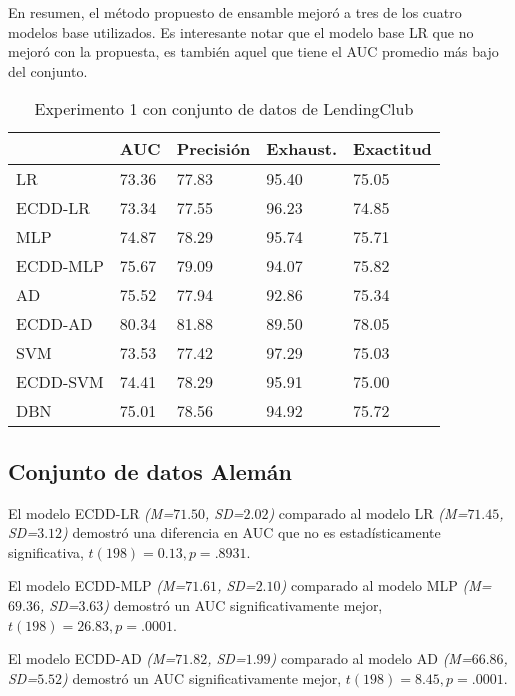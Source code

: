 En resumen, el método propuesto de ensamble mejoró a tres de los cuatro modelos base utilizados. Es interesante notar que el modelo base \ac{LR} que no mejoró con la propuesta, es también aquel que tiene el \ac{AUC} promedio más bajo del conjunto.

\begin{table}[htbp]
\centering
\caption{Experimento 1 con conjunto de datos de LendingClub}
\label{tab:lc-proc1}
\begin{tabularx}{0.75\textwidth}{|l|Y Y Y Y|}
				\hline
				& AUC		& Precisión	& Exhaust.		& Exactitud	\\
				\hline
LR				& 73.36		& 77.83		& 95.40			& 75.05		\\		%
ECDD-LR			& 73.34		& 77.55		& 96.23			& 74.85		\\		%
				\hline
MLP				& 74.87		& 78.29		& 95.74			& 75.71		\\		%
ECDD-MLP		& 75.67		& 79.09		& 94.07			& 75.82		\\		%
				\hline
AD				& 75.52		& 77.94		& 92.86			& 75.34		\\		%
ECDD-AD			& 80.34		& 81.88		& 89.50			& 78.05		\\		%
				\hline
SVM				& 73.53		& 77.42		& 97.29			& 75.03		\\		%
ECDD-SVM		& 74.41		& 78.29		& 95.91			& 75.00		\\		%
				\hline
DBN				& 75.01		& 78.56		& 94.92			& 75.72		\\		%
				\hline
\end{tabularx}
\end{table}


\subsection{Conjunto de datos Alemán}

El modelo ECDD-LR \textit{(M=$71.50$, SD=$2.02$)} comparado al modelo \ac{LR} \textit{(M=$71.45$, SD=$3.12$)} demostró una diferencia en \ac{AUC} que no es estadísticamente significativa, $t(198)=0.13, p=.8931$.

El modelo ECDD-MLP \textit{(M=$71.61$, SD=$2.10$)} comparado al modelo \ac{MLP} \textit{(M=$69.36$, SD=$3.63$)} demostró un \ac{AUC} significativamente mejor, $t(198)=26.83, p=.0001$.

El modelo ECDD-AD \textit{(M=$71.82$, SD=$1.99$)} comparado al modelo \ac{AD} \textit{(M=$66.86$, SD=$5.52$)} demostró un \ac{AUC} significativamente mejor, $t(198)=8.45, p=.0001$.

